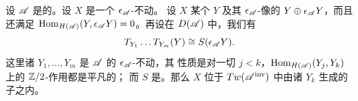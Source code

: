 \begin{lemma}\label{thm:equivariant-split-generation}
设 $\mathscr{A}$ 是\trCfinite{}的。设 $X$ 是一个 $\epsilon_{\mathscr{A}}$-不动\trObject。
设 $X$ \trQuasiRepresent{}某个\trObject{} $Y$ 及其 $\epsilon_{\mathscr{A}}$-像的%
\trDirectSum{} $Y\oplus\epsilon_{\mathscr{A}}Y$，而且还满足
$\operatorname{Hom}_{H(\mathscr{A})}(Y,\epsilon_{\mathscr{A}}Y)=0$。再设在 $D(\mathscr{A})$ 中，我们有%
\trIsomorphism
\begin{equation}\label{eq:iterated-twist-split}
T_{Y_1}\ldots T_{Y_m}(Y)\cong S(\epsilon_{\mathscr{A}}Y).
\end{equation}
这里诸 $Y_1,\ldots,Y_m$ 是 $\mathscr{A}$ 的 $\epsilon_{\mathscr{A}}$-不动\trObject，其
性质是对一切 $j<k$，$\operatorname{Hom}_{H(\mathscr{A})}(Y_j,Y_k)$ 上的 $\mathbb{Z}/2$-作用都是平凡的；
而 $S$ 是\trSuspension。那么 $X$ 位于 $Tw(\mathscr{A}^{\mathrm{inv}})$ 中由诸 $Y_k$
生成的\trTriangulated{}子\trCategory{}之内。
\end{lemma}

